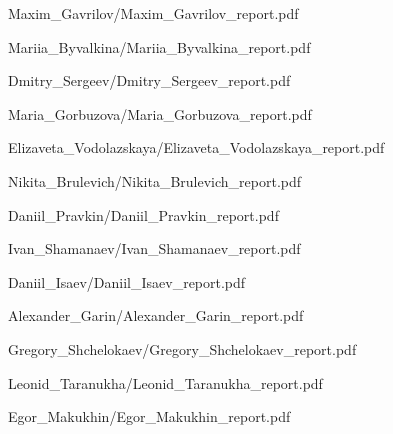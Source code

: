 \documentclass[a4paper]{article}
\begin{document}
{Maxim_Gavrilov/Maxim_Gavrilov_report.pdf}

{Mariia_Byvalkina/Mariia_Byvalkina_report.pdf}

{Dmitry_Sergeev/Dmitry_Sergeev_report.pdf}

{Maria_Gorbuzova/Maria_Gorbuzova_report.pdf}

{Elizaveta_Vodolazskaya/Elizaveta_Vodolazskaya_report.pdf}

{Nikita_Brulevich/Nikita_Brulevich_report.pdf}

{Daniil_Pravkin/Daniil_Pravkin_report.pdf}

{Ivan_Shamanaev/Ivan_Shamanaev_report.pdf}

{Daniil_Isaev/Daniil_Isaev_report.pdf}

{Alexander_Garin/Alexander_Garin_report.pdf}

{Gregory_Shchelokaev/Gregory_Shchelokaev_report.pdf}

{Leonid_Taranukha/Leonid_Taranukha_report.pdf}

{Egor_Makukhin/Egor_Makukhin_report.pdf}
\end{document}
